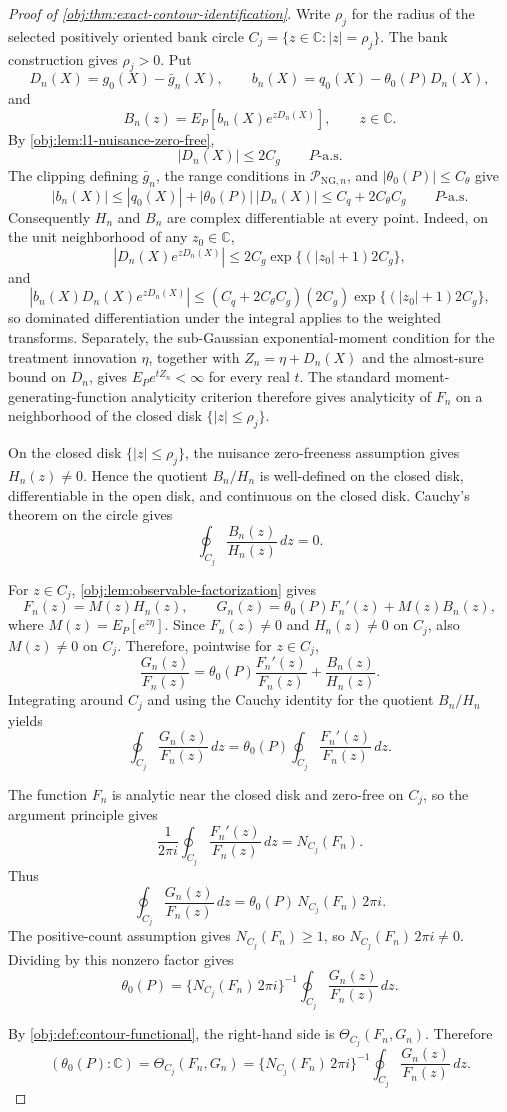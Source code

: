 \begin{proof}[Proof of \cref{obj:thm:exact-contour-identification}]
Write \(\rho_j\) for the radius of the selected positively oriented bank circle \(C_j=\{z\in\mathbb C:|z|=\rho_j\}\).  The bank construction gives \(\rho_j>0\).  Put
\[
D_n(X)=g_0(X)-\bar g_n(X),\qquad
b_n(X)=q_0(X)-\theta_0(P)D_n(X),
\]
and
\[
B_n(z)=E_P\!\left[b_n(X)e^{zD_n(X)}\right],\qquad z\in\mathbb C .
\]
By \cref{obj:lem:l1-nuisance-zero-free},
\[
|D_n(X)|\le 2C_g\qquad P\text{-a.s.}
\]
The clipping defining \(\bar g_n\), the range conditions in \(\mathcal P_{\mathrm{NG},n}\), and \(|\theta_0(P)|\le C_\theta\) give
\[
|b_n(X)|
\le |q_0(X)|+|\theta_0(P)|\,|D_n(X)|
\le C_q+2C_\theta C_g
\qquad P\text{-a.s.}
\]
Consequently \(H_n\) and \(B_n\) are complex differentiable at every point.  Indeed, on the unit neighborhood of any \(z_0\in\mathbb C\),
\[
|D_n(X)e^{zD_n(X)}|
\le 2C_g\exp\{(|z_0|+1)2C_g\},
\]
and
\[
|b_n(X)D_n(X)e^{zD_n(X)}|
\le (C_q+2C_\theta C_g)(2C_g)
   \exp\{(|z_0|+1)2C_g\},
\]
so dominated differentiation under the integral applies to the weighted transforms.  Separately, the sub-Gaussian exponential-moment condition for the treatment innovation \(\eta\), together with \(Z_n=\eta+D_n(X)\) and the almost-sure bound on \(D_n\), gives \(E_P e^{tZ_n}<\infty\) for every real \(t\).  The standard moment-generating-function analyticity criterion therefore gives analyticity of \(F_n\) on a neighborhood of the closed disk \(\{|z|\le \rho_j\}\).

On the closed disk \(\{|z|\le\rho_j\}\), the nuisance zero-freeness assumption gives \(H_n(z)\ne0\).  Hence the quotient \(B_n/H_n\) is well-defined on the closed disk, differentiable in the open disk, and continuous on the closed disk.  Cauchy's theorem on the circle gives
\[
\oint_{C_j}\frac{B_n(z)}{H_n(z)}\,dz=0 .
\]

For \(z\in C_j\), \cref{obj:lem:observable-factorization} gives
\[
F_n(z)=M(z)H_n(z),
\qquad
G_n(z)=\theta_0(P)F_n'(z)+M(z)B_n(z),
\]
where \(M(z)=E_P[e^{z\eta}]\).  Since \(F_n(z)\ne0\) and \(H_n(z)\ne0\) on \(C_j\), also \(M(z)\ne0\) on \(C_j\).  Therefore, pointwise for \(z\in C_j\),
\[
\frac{G_n(z)}{F_n(z)}
=
\theta_0(P)\frac{F_n'(z)}{F_n(z)}
+
\frac{B_n(z)}{H_n(z)} .
\]
Integrating around \(C_j\) and using the Cauchy identity for the quotient \(B_n/H_n\) yields
\[
\oint_{C_j}\frac{G_n(z)}{F_n(z)}\,dz
=
\theta_0(P)
\oint_{C_j}\frac{F_n'(z)}{F_n(z)}\,dz .
\]

The function \(F_n\) is analytic near the closed disk and zero-free on \(C_j\), so the argument principle gives
\[
\frac{1}{2\pi i}
\oint_{C_j}\frac{F_n'(z)}{F_n(z)}\,dz
=
N_{C_j}(F_n).
\]
Thus
\[
\oint_{C_j}\frac{G_n(z)}{F_n(z)}\,dz
=
\theta_0(P)\,N_{C_j}(F_n)\,2\pi i .
\]
The positive-count assumption gives \(N_{C_j}(F_n)\ge1\), so \(N_{C_j}(F_n)\,2\pi i\ne0\).  Dividing by this nonzero factor gives
\[
\theta_0(P)
=
\{N_{C_j}(F_n)\,2\pi i\}^{-1}
\oint_{C_j}\frac{G_n(z)}{F_n(z)}\,dz .
\]

By \cref{obj:def:contour-functional}, the right-hand side is \(\Theta_{C_j}(F_n,G_n)\).  Therefore
\[
(\theta_0(P):\mathbb C)
=
\Theta_{C_j}(F_n,G_n)
=
\{N_{C_j}(F_n)\,2\pi i\}^{-1}
\oint_{C_j}\frac{G_n(z)}{F_n(z)}\,dz .
\]
\end{proof}


